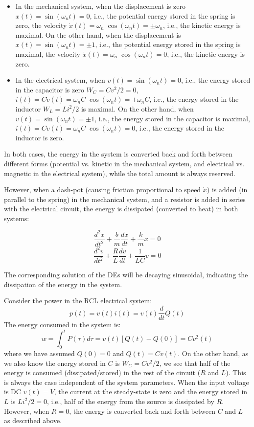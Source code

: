 \begin{itemize}
\begin{itemize}
\item In the mechanical system, when the displacement is zero $x(t)
  =\sin(\omega_n t)=0$, i.e., the potential energy stored in the spring 
  is zero, the velocity $\dot{x}(t)=\omega_n\;\cos(\omega_n t)=\pm \omega_n$,
  i.e., the kinetic energy is maximal. On the other hand, when the 
  displacement is $x(t)=\sin(\omega_n t)=\pm 1$, i.e., the potential 
  energy stored in the spring is maximal, the velocity $\dot{x}(t)=\omega_n
  \;\cos(\omega_n t)=0$, i.e., the kinetic energy is zero.
\item In the electrical system, when $v(t)=\sin(\omega_n t)=0$, i.e., the
  energy stored in the capacitor is zero $W_C=Cv^2/2=0$,
  $i(t)=C\dot{v}(t)=\omega_n C\;\cos(\omega_n t)=\pm \omega_n C$, i.e., 
  the energy stored in the inductor $W_L=Li^2/2$ is maximal. On the other
  hand, when $v(t)=\sin(\omega_n t)=\pm 1$, i.e., the energy stored in the 
  capacitor is maximal, $i(t)=C\dot{v}(t)=\omega_n C\;\cos(\omega_n t)=0$,
  i.e., the energy stored in the inductor is zero. 
\end{itemize}
In both cases, the energy in the system is converted back and forth 
between different forms (potential vs. kinetic in the mechanical system,
and electrical vs. magnetic in the electrical system), while the total
amount is always reserved. 

However, when a dash-pot (causing friction proportional to speed $\dot{x}$)
is added (in parallel to the spring) in the mechanical system, and a resistor 
is added in series with the electrical circuit, the energy is dissipated 
(converted to heat) in both systems:

\[	\frac{d^2x}{dt^2}+\frac{b}{m}\frac{dx}{dt}+\frac{k}{m}x=0	\]
\[	\frac{d^2v}{dt^2}+\frac{R}{L}\frac{dv}{dt}+\frac{1}{LC}v=0	\]


The corresponding solution of the DEs will be decaying sinusoidal,
indicating the dissipation of the energy in the system.

Consider the power in the RCL electrical system:
\[ 
p(t)=v(t) i(t) =v(t) \frac{d}{dt} Q(t) 
\]
The energy consumed in the system is:
\[ 
w=\int_0^t P(\tau) d\tau=v(t) [Q(t)-Q(0)]=Cv^2(t) 
\]
where we have assumed $Q(0)=0$ and $Q(t)=Cv(t)$. On the other hand,
as we also know the energy stored in $C$ is $W_C=Cv^2/2$, we see that
half of the energy is consumed (dissipated/stored) in the rest of 
the circuit ($R$ and $L$). This is always the case independent of 
the system parameters. When the input voltage is DC $v(t)=V$, the 
current at the steady-state is zero and the energy stored in $L$ is 
$Li^2/2=0$, i.e., half of the energy from the source is dissipated
by $R$. However, when $R=0$, the energy is converted back and forth
between $C$ and $L$ as described above.



\end{itemize}
